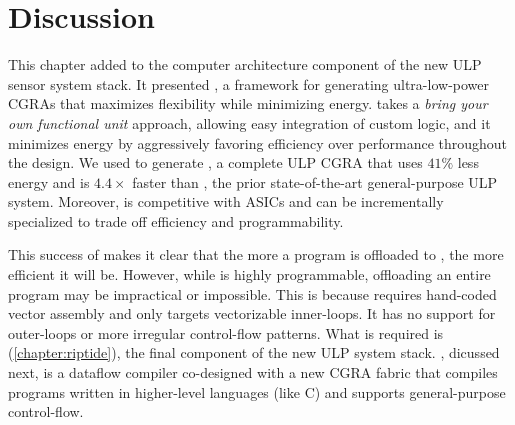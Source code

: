 \section{Discussion}
\label{snafu:discuss}
This chapter added to the computer architecture component of the new ULP sensor system stack.
% 
It presented \snafuframe, a framework for generating ultra-low-power CGRAs that maximizes flexibility while minimizing energy.
% 
\snafuframe takes a {\em bring your own functional unit} approach, allowing easy integration of custom logic,
% 
and it minimizes energy by aggressively favoring efficiency over performance throughout the design.
% 
We used \snafuframe to generate \snafuarch, a complete ULP CGRA that uses $41\%$ less energy and is $4.4\times$ faster than \manic, the prior state-of-the-art general-purpose ULP system.
%
Moreover, \snafuarch is competitive with ASICs and can be incrementally
specialized to trade off efficiency and programmability.

This success of \snafu makes it clear that the more a program is offloaded to \snafu, the more efficient it will be.
% 
However, while \snafu is highly programmable, offloading an entire program may be impractical or impossible.
% 
This is because \snafu requires hand-coded vector assembly and only targets vectorizable inner-loops.
% 
It has no support for outer-loops or more irregular control-flow patterns.
% 
What is required is \riptide (\autoref{chapter:riptide}), the final component of the new ULP system stack.
% 
\riptide, dicussed next, is a dataflow compiler co-designed with a new CGRA fabric that compiles programs written in higher-level languages (like C) and supports general-purpose control-flow.